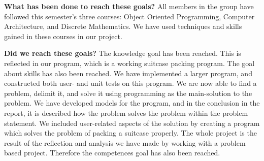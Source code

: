 \textbf{What has been done to reach these goals?} \newline
All members in the group have followed this semester's three courses: Object Oriented Programming, Computer Architecture, and Discrete Mathematics. We have used techniques and skills gained in these courses in our project.

\textbf{Did we reach these goals?} \newline
	The knowledge goal has been reached. This is reflected in our program, which is a working suitcase packing program. The goal about skills has also been reached. We have implemented a larger program, and constructed both user- and unit tests on this program. We are now able to find a problem, delimit it, and solve it using programming as the main-solution to the problem. We have developed models for the program, and in the conclusion in the report, it is described how the problem solves the problem within the problem statement. We included user-related aspects of the solution by creating a program which solves the problem of packing a suitcase properly. The whole project is the result of the reflection and analysis we have made by working with a problem based project. Therefore the competences goal has also been reached. 